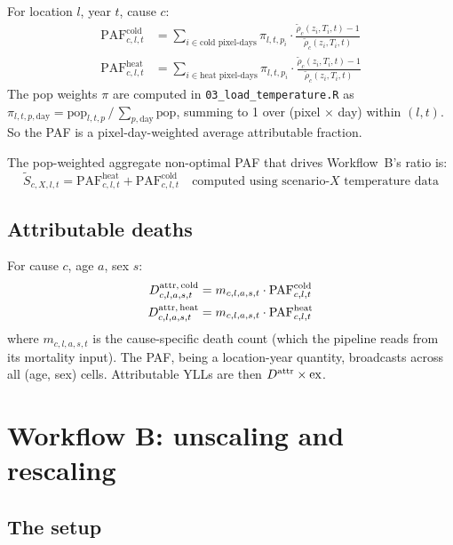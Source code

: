 \documentclass[11pt]{article}
\newcommand{\PAF}{\text{PAF}}
\begin{document}
For location $l$, year $t$, cause $c$:
\begin{align}
\PAF^{\text{cold}}_{c,l,t} &= \sum_{i \in \text{cold pixel-days}}
    \pi_{l,t,p_i} \cdot \frac{\tilde\rho_c(z_i, T_i, t) - 1}{\tilde\rho_c(z_i, T_i, t)} \label{eq:paf-cold} \\
\PAF^{\text{heat}}_{c,l,t} &= \sum_{i \in \text{heat pixel-days}}
    \pi_{l,t,p_i} \cdot \frac{\tilde\rho_c(z_i, T_i, t) - 1}{\tilde\rho_c(z_i, T_i, t)} \label{eq:paf-heat}
\end{align}
The pop weights $\pi$ are computed in
\texttt{03\_load\_temperature.R} as
$\pi_{l,t,p,\text{day}} = \text{pop}_{l,t,p} \,/\, \sum_{p,\text{day}}
\text{pop}$, summing to 1 over (pixel $\times$ day) within $(l, t)$. So
the PAF is a pixel-day-weighted average attributable fraction.

The pop-weighted aggregate non-optimal PAF that drives Workflow~B's ratio
is:
\begin{equation}
\tilde S_{c,X,l,t} = \PAF^{\text{heat}}_{c,l,t} + \PAF^{\text{cold}}_{c,l,t}
\quad \text{computed using scenario-}X\text{ temperature data}
\label{eq:S}
\end{equation}

\subsection{Attributable deaths}

For cause $c$, age $a$, sex $s$:
\begin{align}
\mAttr[cold]_{c,l,a,s,t} &= m_{c,l,a,s,t} \cdot \PAF^{\text{cold}}_{c,l,t} \label{eq:attrib-cold} \\
\mAttr[heat]_{c,l,a,s,t} &= m_{c,l,a,s,t} \cdot \PAF^{\text{heat}}_{c,l,t} \label{eq:attrib-heat}
\end{align}
where $m_{c,l,a,s,t}$ is the cause-specific death count (which the
pipeline reads from its mortality input). The PAF, being a location-year
quantity, broadcasts across all (age, sex) cells. Attributable YLLs are
then $\mAttr \times \text{ex}$.

\section{Workflow B: unscaling and rescaling}
\label{sec:workflowb}

\subsection{The setup}
\end{document}
